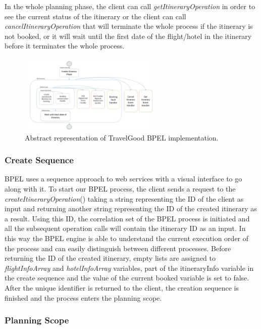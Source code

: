 In the whole planning phase, the client can call \textit{getItineraryOperation} in order to see the current status of the itinerary or the client can call \textit{cancelItineraryOperation} that will terminate the whole process if the itinerary is not booked, or it will wait until the first date of the flight/hotel in the itinerary before it terminates the whole process.

\begin{figure}[H]
\centering
\includegraphics[width=0.6\textwidth]{images/bpel_abstract_impl.jpg}
\caption{Abstract representation of TravelGood BPEL implementation.}
\label{statediagram}
\end{figure}

\subsubsection*{Create Sequence}
BPEL uses a sequence approach to web services with a visual interface to go along with it. To start our BPEL process, the client sends a request to the \textit{createItineraryOperation}() taking a string representing the ID of the client as input and returning another string representing the ID of the created itinerary as a result. Using this ID, the correlation set of the BPEL process is initiated and all the subsequent operation calls will contain the itinerary ID as an input. In this way the BPEL engine is able to understand the current execution order of the process and can easily distinguish between different processes. Before returning the ID of the created itinerary, empty lists are assigned  to \textit{flightInfoArray} and \textit{hotelInfoArray} variables, part of the itineraryInfo variable in the create sequence and the value of the current booked variable is set to false. After the unique identifier is returned to the client, the creation sequence is finished and the process enters the planning scope.

\subsubsection*{Planning Scope}

